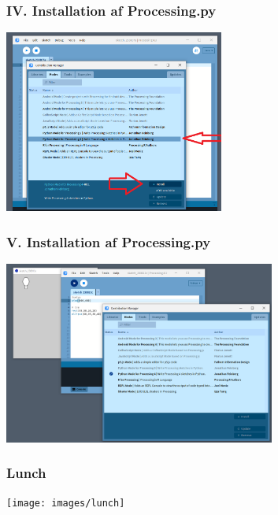 \documentclass[10pt]{beamer}
\begin{document}
\begin{frame}
  \frametitle{IV. Installation af Processing.py}
   \vspace{10 mm}
    \hspace{8 em}
   \includegraphics[height=6cm]{images/python02}
\end{frame}


\begin{frame}
  \frametitle{V. Installation af Processing.py}
  \vspace{10 mm}
    \hspace{8 em}
   \includegraphics[height=6cm]{images/python03}
\end{frame}


\begin{frame}
 \frametitle{Lunch}
   \vspace{5 mm}
    \hspace{8 mm}

  \texttt{[image: images/lunch]}

\end{frame}






\end{document}
